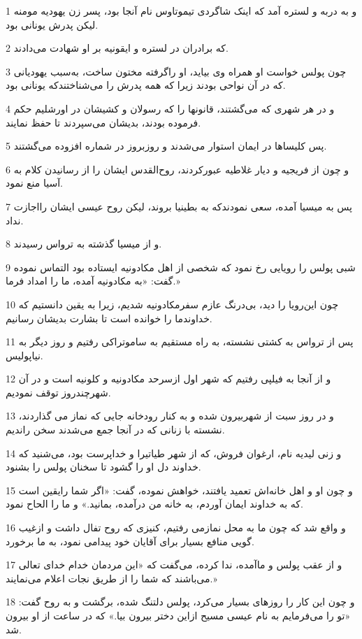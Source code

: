 \par 1 و به دربه و لستره آمد که اینک شاگردی تیموتاوس نام آنجا بود، پسر زن یهودیه مومنه لیکن پدرش یونانی بود.
\par 2 که برادران در لستره و ایقونیه بر او شهادت می‌دادند.
\par 3 چون پولس خواست او همراه وی بیاید، او راگرفته مختون ساخت، به‌سبب یهودیانی که در آن نواحی بودند زیرا که همه پدرش را می‌شناختندکه یونانی بود.
\par 4 و در هر شهری که می‌گشتند، قانونها را که رسولان و کشیشان در اورشلیم حکم فرموده بودند، بدیشان می‌سپردند تا حفظ نمایند.
\par 5 پس کلیساها در ایمان استوار می‌شدند و روزبروز در شماره افزوده می‌گشتند.
\par 6 و چون از فریجیه و دیار غلاطیه عبورکردند، روح‌القدس ایشان را از رسانیدن کلام به آسیا منع نمود.
\par 7 پس به میسیا آمده، سعی نمودندکه به بطینیا بروند، لیکن روح عیسی ایشان رااجازت نداد.
\par 8 و از میسیا گذشته به ترواس رسیدند.
\par 9 شبی پولس را رویایی رخ نمود که شخصی از اهل مکادونیه ایستاده بود التماس نموده گفت: «به مکادونیه آمده، ما را امداد فرما.»
\par 10 چون این‌رویا را دید، بی‌درنگ عازم سفرمکادونیه شدیم، زیرا به یقین دانستیم که خداوندما را خوانده است تا بشارت بدیشان رسانیم.
\par 11 پس از ترواس به کشتی نشسته، به راه مستقیم به ساموتراکی رفتیم و روز دیگر به نیاپولیس.
\par 12 و از آنجا به فیلپی رفتیم که شهر اول ازسرحد مکادونیه و کلونیه است و در آن شهر‌چندروز توقف نمودیم.
\par 13 و در روز سبت از شهربیرون شده و به کنار رودخانه جایی که نماز می گذاردند، نشسته با زنانی که در آنجا جمع می‌شدند سخن راندیم.
\par 14 و زنی لیدیه نام، ارغوان فروش، که از شهر طیاتیرا و خداپرست بود، می‌شنید که خداوند دل او را گشود تا سخنان پولس را بشنود.
\par 15 و چون او و اهل خانه‌اش تعمید یافتند، خواهش نموده، گفت: «اگر شما رایقین است که به خداوند ایمان آوردم، به خانه من درآمده، بمانید.» و ما را الحاح نمود.
\par 16 و واقع شد که چون ما به محل نمازمی رفتیم، کنیزی که روح تفال داشت و ازغیب گویی منافع بسیار برای آقایان خود پیدامی نمود، به ما برخورد.
\par 17 و از عقب پولس و ماآمده، ندا کرده، می‌گفت که «این مردمان خدام خدای تعالی می‌باشند که شما را از طریق نجات اعلام می‌نمایند.»
\par 18 و چون این کار را روزهای بسیار می‌کرد، پولس دلتنگ شده، برگشت و به روح گفت: «تو را می‌فرمایم به نام عیسی مسیح ازاین دختر بیرون بیا.» که در ساعت از او بیرون شد.
